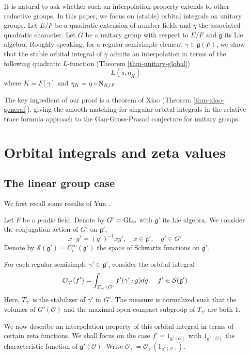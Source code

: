 \documentclass[a4paper]{amsart}
\newcommand{\CO}{{\mathcal {O}}} \newcommand{\CP}{{\mathcal {P}}}
\newcommand{\CS}{{\mathcal {S}}} \newcommand{\CT}{{\mathcal {T}}}
\newcommand{\fg}{{\mathfrak{g}}} \newcommand{\fh}{{\mathfrak{h}}}
\theoremstyle{plain}
\theoremstyle{remark} \newtheorem{remark}[thm]{Remark}
\theoremstyle{exercise} \newtheorem{exercise}[thm]{Exercise}
\theoremstyle{example} \newtheorem{example}[thm]{Example}
\theoremstyle{question} \newtheorem{question}[thm]{Question}
\theoremstyle{assumption} \newtheorem{assumption}[thm]{Assumption}
\numberwithin{equation}{section}
\begin{document}
It is natural to ask whether such an interpolation property extends to other reductive groups.  In this paper, we focus on 
(stable) orbital integrals on unitary groups.  Let $E/F$ be
a quadratic extension of number fields and $\eta$ the associated
quadratic character. Let $G$ be a
unitary group with respect to $E/F$ and $\fg$ its Lie algebra. 
Roughly speaking, for a regular semisimple element $\gamma \in \fg(F)$, we show that the stable orbital integral of $\gamma$ admits an interpolation in terms of the following quadratic $L$-function (Theorem \ref{thm-unitary-global})
\[L(s,\eta_K)\]
where $K = F[\gamma]$ and  $\eta_K = \eta \circ {\mathrm {N}}_{K/F}$.

The key ingredient of our proof is a theorem of Xiao \cite{Xia19}
(Theorem \ref{thm-xiao-general}), giving the smooth matching for singular orbital integrals  in the relative trace formula approach to the Gan-Gross-Prasad conjecture for unitary groups.




\section{Orbital integrals and zeta values}\label{sec-orb}

\subsection{The linear group case}

We first recall some results of Yun \cite{Yun13}.

Let $F$ be a $p$-adic field. Denote by $G' = {\mathrm{GL}}_n$ with $\fg'$ its Lie algebra. We consider the conjugation action of $G'$ on $\fg'$,
\[x \cdot g' = (g')^{-1} x g', \quad x \in \fg', \quad g' \in G'.\] 
Denote by $\CS(\fg') = C_c^\infty(\fg')$ the space of Schwartz functions on $\fg'$.

For each regular semisimple $\gamma' \in \fg'$,
consider the orbital integral
\[\CO_{\gamma'}(f') = \int_{T_{\gamma'} \bs G'} f'(\gamma' \cdot g)dg, \quad f' \in \CS(\fg').\]
Here, $T_{\gamma'}$ is the stabilizer of $\gamma'$ in $G'$. The
measure is normalized such that the volumes of $G'(\CO)$  and the
maximal open compact subgroup of $T_{\gamma'}$ are both $1$. 

We now describe an interpolation property of this orbital integral in terms of certain zeta functions. We shall focus on the case $f' = 1_{\fg'(\CO)}$ with $1_{\fg'(\CO)}$ the characteristic function of $\fg'(\CO)$. Write $\CO_{\gamma'} = \CO_{\gamma'}(1_{\fg'(\CO)})$. 
\end{document}
